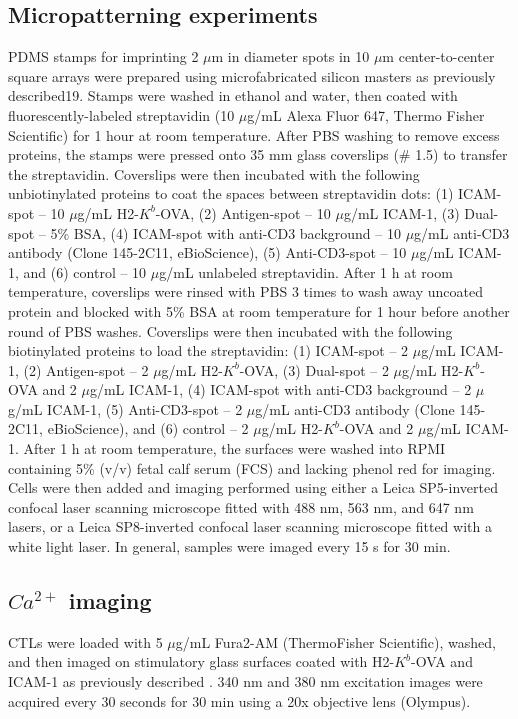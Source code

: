 \subsection{Micropatterning experiments}
PDMS stamps for imprinting 2 $\mu$m in diameter spots in 10 $\mu$m center-to-center square arrays were prepared using microfabricated silicon masters as previously described19. Stamps were washed in ethanol and water, then coated with fluorescently-labeled streptavidin (10 $\mu$g/mL Alexa Fluor 647, Thermo Fisher Scientific) for 1 hour at room temperature. After PBS washing to remove excess proteins, the stamps were pressed onto 35 mm glass coverslips (\# 1.5) to transfer the streptavidin. Coverslips were then incubated with the following unbiotinylated proteins to coat the spaces between streptavidin dots: (1) ICAM-spot – 10 $\mu$g/mL H2-$K^{b}$-OVA, (2) Antigen-spot – 10 $\mu$g/mL ICAM-1, (3) Dual-spot – 5\% BSA, (4) ICAM-spot with anti-CD3 background – 10 $\mu$g/mL anti-CD3 antibody (Clone 145-2C11, eBioScience), (5) Anti-CD3-spot – 10 $\mu$g/mL ICAM-1, and (6) control – 10 $\mu$g/mL unlabeled streptavidin. After 1 h at room temperature, coverslips were rinsed with PBS 3 times to wash away uncoated protein and blocked with 5\% BSA at room temperature for 1 hour before another round of PBS washes. Coverslips were then incubated with the following biotinylated proteins to load the streptavidin: (1) ICAM-spot – 2 $\mu$g/mL ICAM-1, (2) Antigen-spot – 2 $\mu$g/mL H2-$K^{b}$-OVA, (3) Dual-spot – 2 $\mu$g/mL H2-$K^{b}$-OVA and 2 $\mu$g/mL ICAM-1, (4) ICAM-spot with anti-CD3 background – 2 $\mu$g/mL ICAM-1, (5) Anti-CD3-spot – 2 $\mu$g/mL anti-CD3 antibody (Clone 145-2C11, eBioScience), and (6) control – 2 $\mu$g/mL H2-$K^{b}$-OVA and 2 $\mu$g/mL ICAM-1. After 1 h at room temperature, the surfaces were washed into RPMI containing 5\% (v/v) fetal calf serum (FCS) and lacking phenol red for imaging. Cells were then added and imaging performed using either a Leica SP5-inverted confocal laser scanning microscope fitted with 488 nm, 563 nm, and 647 nm lasers, or a Leica SP8-inverted confocal laser scanning microscope fitted with a white light laser. In general, samples were imaged every 15 s for 30 min. 

\subsection{$Ca^{2+}$ imaging}
CTLs were loaded with 5 $\mu$g/mL Fura2-AM (ThermoFisher Scientific), washed, and then imaged on stimulatory glass surfaces coated with H2-$K^{b}$-OVA and ICAM-1 as previously described \cite{Quann2009}. 340 nm and 380 nm excitation images were acquired every 30 seconds for 30 min using a 20x objective lens (Olympus). 

